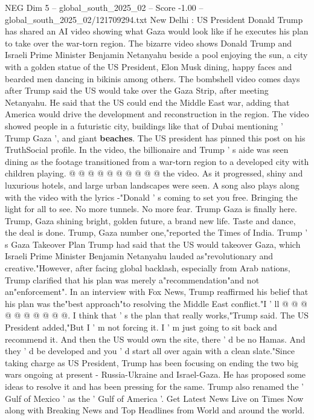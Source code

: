 \begin{textsample}{NEG Dim 5 – global\_south\_2025\_02 – Score -1.00 – global\_south\_2025\_02/121709294.txt}  \label{ex:f5_neg_242}
New Delhi : US President Donald Trump has shared an AI video showing what Gaza would look like if he executes his plan to take over the war-torn region.
The bizarre video shows Donald Trump and Israeli Prime Minister Benjamin Netanyahu beside a pool enjoying the sun, a city with a golden statue of the US President, Elon Musk dining, happy faces and bearded men dancing in bikinis among others.
The bombshell video comes days after Trump said the US would take over the Gaza Strip, after meeting Netanyahu.
He said that the US could end the Middle East war, adding that America would drive the development and reconstruction in the region.
The video showed people in a futuristic city, buildings like that of Dubai mentioning ' Trump Gaza ', and giant \textbf{beaches}.
The US president has pinned this post on his TruthSocial profile.
In the video, the billionaire and Trump ' s aide was seen dining as the footage transitioned from a war-torn region to a developed city with children playing. @ @ @ @ @ @ @ @ @ @ the video.
As it progressed, shiny and luxurious hotels, and large urban landscapes were seen.
A song also plays along with the video with the lyrics -"Donald ' s coming to set you free.
Bringing the light for all to see.
No more tunnels.
No more fear.
Trump Gaza is finally here.
Trump, Gaza shining bright, golden future, a brand new life.
Taste and dance, the deal is done.
Trump, Gaza number one,"reported the Times of India.
Trump ' s Gaza Takeover Plan Trump had said that the US would takeover Gaza, which Israeli Prime Minister Benjamin Netanyahu lauded as"revolutionary and creative."However, after facing global backlash, especially from Arab nations, Trump clarified that his plan was merely a"recommendation"and not an"enforcement".
In an interview with Fox News, Trump reaffirmed his belief that his plan was the"best approach"to resolving the Middle East conflict."I ' ll @ @ @ @ @ @ @ @ @ @.
I think that ' s the plan that really works,"Trump said.
The US President added,"But I ' m not forcing it.
I ' m just going to sit back and recommend it.
And then the US would own the site, there ' d be no Hamas.
And they ' d be developed and you ' d start all over again with a clean slate."Since taking charge as US President, Trump has been focusing on ending the two big wars ongoing at present - Russia-Ukraine and Israel-Gaza.
He has proposed some ideas to resolve it and has been pressing for the same.
Trump also renamed the ' Gulf of Mexico ' as the ' Gulf of America '.
Get Latest News Live on Times Now along with Breaking News and Top Headlines from World and around the world.

\end{textsample}
